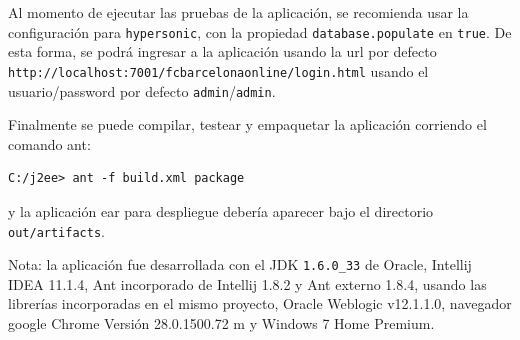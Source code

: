 \documentclass[letter]{article}
\begin{document}
Al momento de ejecutar las pruebas de la aplicación, se recomienda usar la configuración para \texttt{hypersonic}, con la propiedad \texttt{database.populate} en \texttt{true}. De esta forma, se podrá ingresar a la aplicación usando la url por defecto \texttt{http://localhost:7001/fcbarcelonaonline/login.html} usando el usuario/password por defecto \texttt{admin}/\texttt{admin}.

Finalmente se puede compilar, testear y empaquetar la aplicación corriendo el comando ant:
\begin{verbatim}
C:/j2ee> ant -f build.xml package
\end{verbatim}

y la aplicación ear para despliegue debería aparecer bajo el directorio \texttt{out/artifacts}.

Nota: la aplicación fue desarrollada con el JDK \texttt{1.6.0\_33} de Oracle, Intellij IDEA 11.1.4, Ant incorporado de Intellij 1.8.2 y Ant externo 1.8.4, usando las librerías incorporadas en el mismo proyecto, Oracle Weblogic v12.1.1.0, navegador google Chrome Versión 28.0.1500.72 m y Windows 7 Home Premium.
\end{document}
